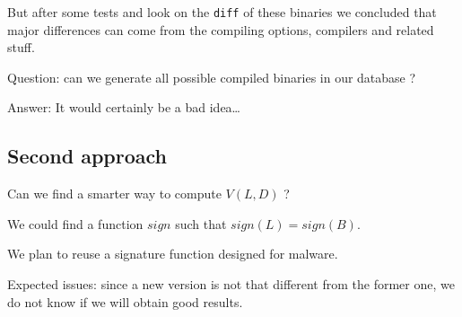 \documentclass{article}
\newcommand{\signature}{{sign}}
\begin{document}
    But after some tests and look on the \verb|diff| of these binaries we
    concluded that major differences can come from the compiling options,
    compilers and related stuff.

    Question: can we generate all possible compiled binaries in our database ? 
    
    Answer: It would certainly be a bad idea\dots

    \subsection{Second approach}
    Can we find a smarter way to compute $V(L,D)$ ?

    We could find a function $\signature$ such that $\signature(L) =
    \signature(B)$.

    We plan to reuse a signature function designed for malware.

    Expected issues: since a new version is not that different from the former
    one, we do not know if we will obtain good results.
\end{document}
